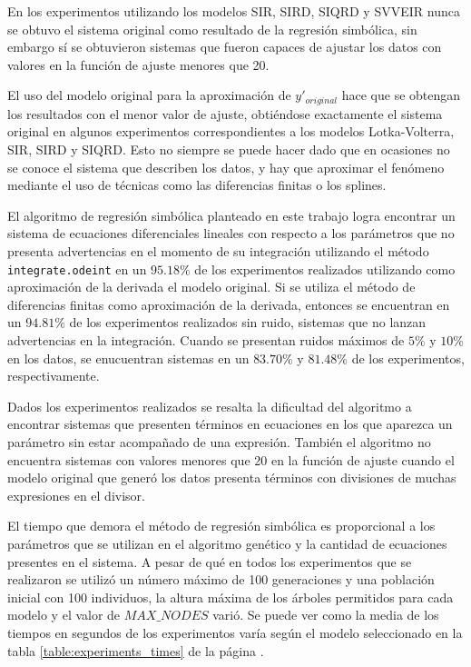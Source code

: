 En los experimentos utilizando los modelos SIR, SIRD, SIQRD y SVVEIR nunca se obtuvo el sistema original como resultado de la regresión simbólica, sin embargo sí se obtuvieron sistemas que fueron capaces de ajustar los datos con valores en la función de ajuste menores que 20.

El uso del modelo original para la aproximación de $y'_{original}$ hace que se obtengan los resultados con el menor valor de ajuste, obtiéndose exactamente el sistema original en algunos experimentos correspondientes a los modelos Lotka-Volterra, SIR, SIRD y SIQRD. Esto no siempre se puede hacer dado que en ocasiones no se conoce el sistema que describen los datos, y hay que aproximar el fenómeno mediante el uso de técnicas como las diferencias finitas o los splines.

El algoritmo de regresión simbólica planteado en este trabajo logra encontrar un sistema de ecuaciones diferenciales lineales con respecto a los parámetros que no presenta advertencias en el momento de su integración utilizando el método \texttt{integrate.odeint} en un $95.18\%$ de los experimentos realizados utilizando como aproximación de la derivada el modelo original. Si se utiliza el método de diferencias finitas como aproximación de la derivada, entonces se encuentran en un $94.81\%$ de los experimentos realizados sin ruido, sistemas que no lanzan advertencias en la integración. Cuando se presentan ruidos máximos de $5\%$ y $10\%$ en los datos, se enucuentran sistemas en un $83.70\%$ y $81.48\%$ de los experimentos, respectivamente.

Dados los experimentos realizados se resalta la dificultad del algoritmo a encontrar sistemas que presenten términos en ecuaciones en los que aparezca un parámetro sin estar acompañado de una expresión. También el algoritmo no encuentra sistemas con valores menores que 20 en la función de ajuste cuando el modelo original que generó los datos presenta términos con divisiones de muchas expresiones en el divisor.

El tiempo que demora el método de regresión simbólica es proporcional a los parámetros que se utilizan en el algoritmo genético y la cantidad de ecuaciones presentes en el sistema. A pesar de qué en todos los experimentos que se realizaron se utilizó un número máximo de 100 generaciones y una población inicial con 100 individuos, la altura máxima de los árboles permitidos para cada modelo y el valor de $MAX\_NODES$ varió. Se puede ver como la media de los tiempos en segundos de los experimentos varía según el modelo seleccionado en la tabla \ref{table:experiments_times} de la página \pageref{table:experiments_times}.

